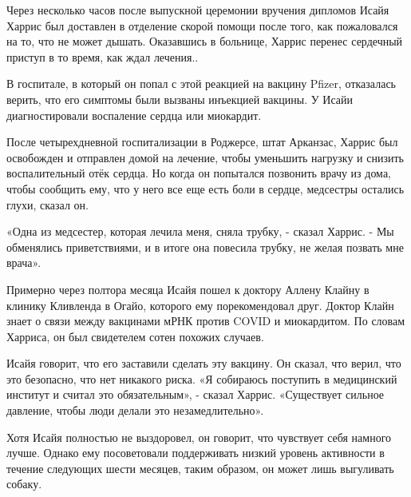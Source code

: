 Через несколько часов после выпускной церемонии вручения дипломов Исайя Харрис
был доставлен в отделение скорой помощи после того, как пожаловался на то, что
не может дышать. Оказавшись в больнице, Харрис перенес сердечный приступ в то
время, как ждал лечения..

В госпитале, в который он попал с этой реакцией на вакцину Pfizer, отказалась
верить, что его симптомы были вызваны инъекцией вакцины. У Исайи диагностировали
воспаление сердца или миокардит.

После четырехдневной госпитализации в Роджерсе, штат Арканзас, Харрис был
освобожден и отправлен домой на лечение, чтобы уменьшить нагрузку и снизить
воспалительный отёк сердца. Но когда он попытался позвонить врачу из дома, чтобы
сообщить ему, что у него все еще есть боли в сердце, медсестры остались глухи,
сказал он.

«Одна из медсестер, которая лечила меня, сняла трубку, - сказал Харрис. - Мы
обменялись приветствиями, и в итоге она повесила трубку, не желая позвать мне
врача».

Примерно через полтора месяца Исайя пошел к доктору Аллену Клайну в клинику
Кливленда в Огайо, которого ему порекомендовал друг. Доктор Клайн знает о связи
между вакцинами мРНК против COVID и миокардитом. По словам Харриса, он был
свидетелем сотен похожих случаев.

Исайя говорит, что его заставили сделать эту вакцину. Он сказал, что верил, что
это безопасно, что нет никакого риска. «Я собираюсь поступить в медицинский
институт и считал это обязательным», - сказал Харрис. «Существует сильное
давление, чтобы люди делали это незамедлительно».

Хотя Исайя полностью не выздоровел, он говорит, что чувствует себя намного
лучше. Однако ему посоветовали поддерживать низкий уровень активности в течение
следующих шести месяцев, таким образом, он может лишь выгуливать собаку.

